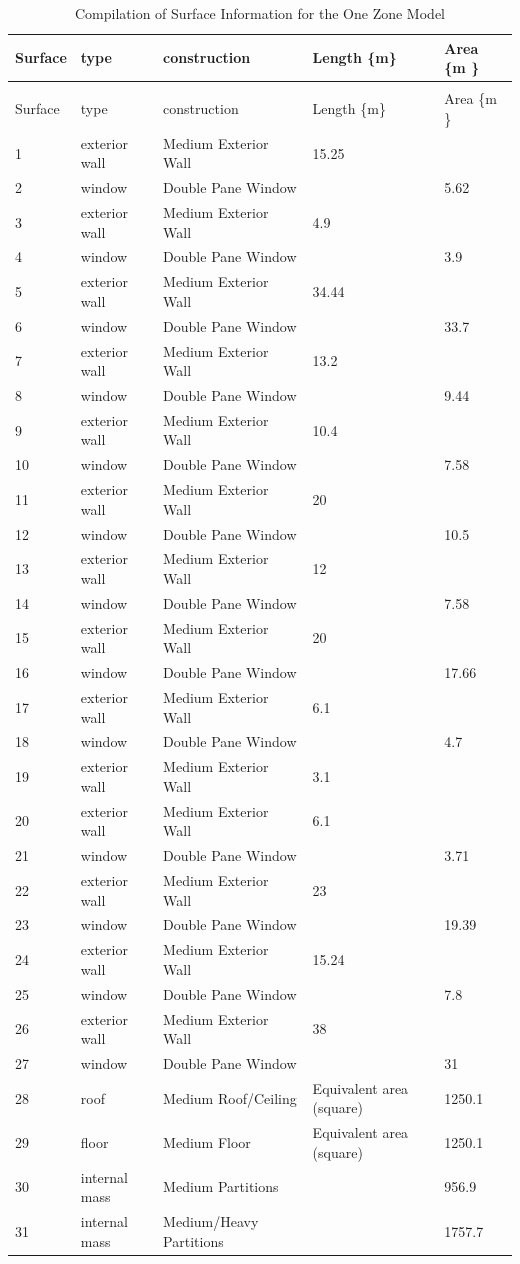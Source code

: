 \begin{longtable}[c]{p{1.2in}p{1.2in}p{1.2in}p{1.2in}p{1.2in}}
\caption{Compilation of Surface Information for the One Zone Model \label{table:compilation-of-surface-information-for}} \tabularnewline
\toprule
Surface & type & construction & Length \{m\} & Area \{m  \} \tabularnewline
\midrule
\endfirsthead

\caption[]{Compilation of Surface Information for the One Zone Model} \tabularnewline
\toprule
Surface & type & construction & Length \{m\} & Area \{m  \} \tabularnewline
\midrule
\endhead

1 & exterior wall & Medium Exterior Wall & 15.25 & ~ \tabularnewline
2 & window & Double Pane Window & ~ & 5.62 \tabularnewline
3 & exterior wall & Medium Exterior Wall & 4.9 & ~ \tabularnewline
4 & window & Double Pane Window & ~ & 3.9 \tabularnewline
5 & exterior wall & Medium Exterior Wall & 34.44 & ~ \tabularnewline
6 & window & Double Pane Window & ~ & 33.7 \tabularnewline
7 & exterior wall & Medium Exterior Wall & 13.2 & ~ \tabularnewline
8 & window & Double Pane Window & ~ & 9.44 \tabularnewline
9 & exterior wall & Medium Exterior Wall & 10.4 & ~ \tabularnewline
10 & window & Double Pane Window & ~ & 7.58 \tabularnewline
11 & exterior wall & Medium Exterior Wall & 20 & ~ \tabularnewline
12 & window & Double Pane Window & ~ & 10.5 \tabularnewline
13 & exterior wall & Medium Exterior Wall & 12 & ~ \tabularnewline
14 & window & Double Pane Window & ~ & 7.58 \tabularnewline
15 & exterior wall & Medium Exterior Wall & 20 & ~ \tabularnewline
16 & window & Double Pane Window & ~ & 17.66 \tabularnewline
17 & exterior wall & Medium Exterior Wall & 6.1 & ~ \tabularnewline
18 & window & Double Pane Window & ~ & 4.7 \tabularnewline
19 & exterior wall & Medium Exterior Wall & 3.1 & ~ \tabularnewline
20 & exterior wall & Medium Exterior Wall & 6.1 & ~ \tabularnewline
21 & window & Double Pane Window & ~ & 3.71 \tabularnewline
22 & exterior wall & Medium Exterior Wall & 23 & ~ \tabularnewline
23 & window & Double Pane Window & ~ & 19.39 \tabularnewline
24 & exterior wall & Medium Exterior Wall & 15.24 & ~ \tabularnewline
25 & window & Double Pane Window & ~ & 7.8 \tabularnewline
26 & exterior wall & Medium Exterior Wall & 38 & ~ \tabularnewline
27 & window & Double Pane Window & ~ & 31 \tabularnewline
28 & roof & Medium Roof/Ceiling & Equivalent area (square) & 1250.1 \tabularnewline
29 & floor & Medium Floor & Equivalent area (square) & 1250.1 \tabularnewline
30 & internal mass & Medium Partitions & ~ & 956.9 \tabularnewline
31 & internal mass & Medium/Heavy Partitions & ~ & 1757.7 \tabularnewline
\bottomrule
\end{longtable}

